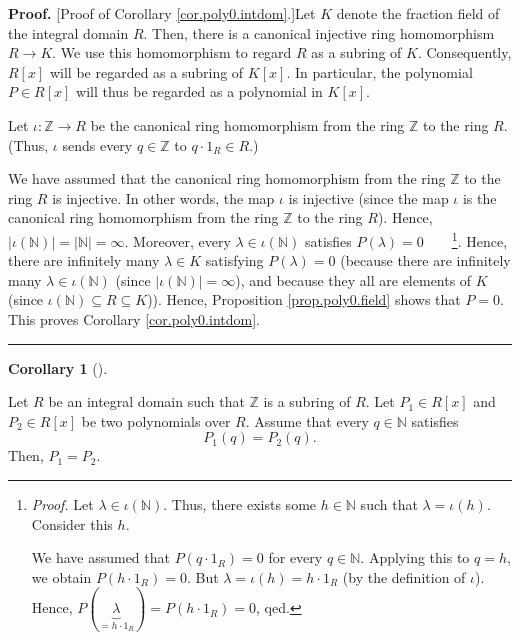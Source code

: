 \documentclass[numbers=enddot,12pt,final,onecolumn,notitlepage]{scrartcl}%
\theoremstyle{definition}
\newtheorem{coro}[theo]{Corollary}
\newenvironment{corollary}[1][]
{\begin{coro}[#1]\begin{leftbar}}
{\end{leftbar}\end{coro}}
\newenvironment{proof}[1][Proof]{\noindent\textbf{#1.} }{\ \rule{0.5em}{0.5em}}
\newenvironment{verlong}{}{}
\begin{document}
\begin{verlong}
\begin{proof}
[Proof of Corollary \ref{cor.poly0.intdom}.]Let $K$ denote the fraction field
of the integral domain $R$. Then, there is a canonical injective ring
homomorphism $R\rightarrow K$. We use this homomorphism to regard $R$ as a
subring of $K$. Consequently, $R\left[  x\right]  $ will be regarded as a
subring of $K\left[  x\right]  $. In particular, the polynomial $P\in R\left[
x\right]  $ will thus be regarded as a polynomial in $K\left[  x\right]  $.

Let $\iota:\mathbb{Z}\rightarrow R$ be the canonical ring homomorphism from
the ring $\mathbb{Z}$ to the ring $R$. (Thus, $\iota$ sends every
$q\in\mathbb{Z}$ to $q\cdot1_{R}\in R$.)

We have assumed that the canonical ring homomorphism from the ring
$\mathbb{Z}$ to the ring $R$ is injective. In other words, the map $\iota$ is
injective (since the map $\iota$ is the canonical ring homomorphism from the
ring $\mathbb{Z}$ to the ring $R$). Hence, $\left\vert \iota\left(
\mathbb{N}\right)  \right\vert =\left\vert \mathbb{N}\right\vert =\infty$.
Moreover, every $\lambda\in\iota\left(  \mathbb{N}\right)  $ satisfies
$P\left(  \lambda\right)  =0$\ \ \ \ \footnote{\textit{Proof.} Let $\lambda
\in\iota\left(  \mathbb{N}\right)  $. Thus, there exists some $h\in\mathbb{N}$
such that $\lambda=\iota\left(  h\right)  $. Consider this $h$.
\par
We have assumed that $P\left(  q\cdot1_{R}\right)  =0$ for every
$q\in\mathbb{N}$. Applying this to $q=h$, we obtain $P\left(  h\cdot
1_{R}\right)  =0$. But $\lambda=\iota\left(  h\right)  =h\cdot1_{R}$ (by the
definition of $\iota$). Hence, $P\left(  \underbrace{\lambda}_{=h\cdot1_{R}%
}\right)  =P\left(  h\cdot1_{R}\right)  =0$, qed.}. Hence, there are
infinitely many $\lambda\in K$ satisfying $P\left(  \lambda\right)  =0$
(because there are infinitely many $\lambda\in\iota\left(  \mathbb{N}\right)
$ (since $\left\vert \iota\left(  \mathbb{N}\right)  \right\vert =\infty$),
and because they all are elements of $K$ (since $\iota\left(  \mathbb{N}%
\right)  \subseteq R\subseteq K$)). Hence, Proposition \ref{prop.poly0.field}
shows that $P=0$. This proves Corollary \ref{cor.poly0.intdom}.
\end{proof}
\end{verlong}

\begin{corollary}
\label{cor.poly0.P1=P2}Let $R$ be an integral domain such that $\mathbb{Z}$ is
a subring of $R$. Let $P_{1}\in R\left[  x\right]  $ and $P_{2}\in R\left[
x\right]  $ be two polynomials over $R$. Assume that every $q\in\mathbb{N}$
satisfies%
\begin{equation}
P_{1}\left(  q\right)  =P_{2}\left(  q\right)  .
\label{eq.cor.poly0.P1=P2.ass}%
\end{equation}
Then, $P_{1}=P_{2}$.
\end{corollary}
\end{document}
